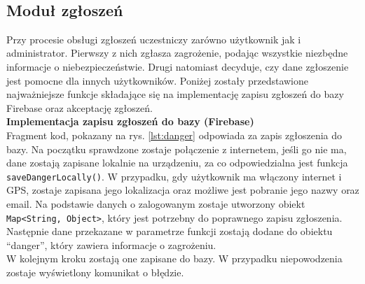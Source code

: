 \noindent
\setlength{\fboxrule}{0.5pt}
\begin{minipage}{\linewidth}
    \label{lst:rystras}
    \centering
\end{minipage}
\\

\subsection{Moduł zgłoszeń}
Przy procesie obsługi zgłoszeń uczestniczy zarówno użytkownik jak i administrator. Pierwszy z nich zgłasza zagrożenie, podając wszystkie niezbędne informacje o niebezpieczeństwie. Drugi natomiast decyduje, czy dane zgłoszenie jest pomocne dla innych użytkowników.  Poniżej zostały przedstawione najważniejsze funkcje składające się na implementację zapisu zgłoszeń do bazy Firebase oraz akceptację zgłoszeń.
\\

\noindent
\textbf{Implementacja zapisu zgłoszeń do bazy (Firebase)} \\ 
\indent Fragment kod, pokazany na rys. \ref{lst:danger} odpowiada za zapis zgłoszenia do bazy. Na początku sprawdzone zostaje połączenie z internetem, jeśli go nie ma, dane zostają zapisane lokalnie na urządzeniu, za co odpowiedzialna jest funkcja \verb|saveDangerLocally()|. W przypadku, gdy użytkownik ma włączony internet i GPS, zostaje zapisana jego lokalizacja oraz możliwe jest pobranie jego nazwy oraz email. Na podstawie danych o zalogowanym zostaje utworzony obiekt  \verb|Map<String, Object>|, który jest potrzebny do poprawnego zapisu zgłoszenia. Następnie dane przekazane w parametrze funkcji zostają dodane do obiektu “danger”, który zawiera informacje o zagrożeniu. \\W kolejnym kroku zostają one zapisane do bazy. W przypadku niepowodzenia zostaje wyświetlony komunikat o błędzie. \\

